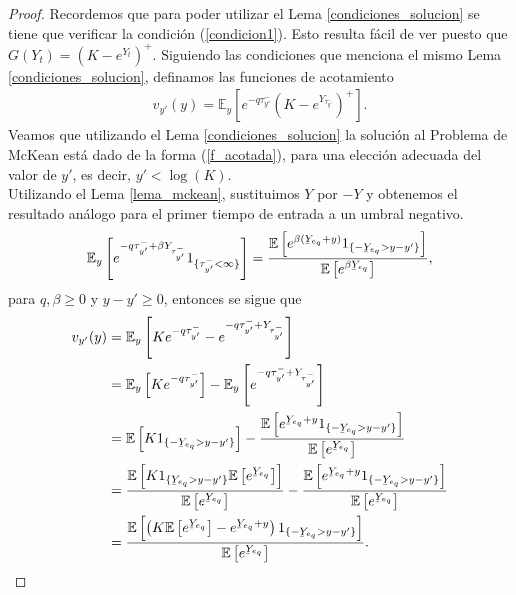 \begin{proof}
Recordemos que para poder utilizar el Lema \ref{condiciones_solucion} se tiene que verificar la condición (\ref{condicion1}). Esto resulta fácil de ver puesto que $G(Y_t) = (K - e^{Y_t})^{+}$. Siguiendo las condiciones que menciona el mismo Lema \ref{condiciones_solucion}, definamos las funciones de acotamiento
\begin{align}
v_{y'}(y) = \mathbb{E}_y \left[ e^{-q \tau_{y'}^{-}} \left( K - e^{Y_{\tau_{y'}^{-}}} \right)^{+} \right]. \label{f_acotada}
\end{align}
Veamos que utilizando el Lema \ref{condiciones_solucion} la solución al Problema de McKean está dado de la forma (\ref{f_acotada}), para una elección adecuada del valor de $y'$, es decir, $y' < \log(K)$. \\

Utilizando el Lema \ref{lema_mckean}, sustituimos $Y$ por $-Y$ y obtenemos el resultado análogo para el primer tiempo de entrada a un umbral negativo.
\begin{align}
	\mathbb{E}_y \left[ e^{-q \tau_{y'}^{-} + \beta Y_{\tau_{y'}^{-}}} 1_{\{\tau_{y'}^{-} < \infty\}} \right] = \frac{\mathbb{E} \left[ e^{\beta (\ubar{Y}_{e_q} + y)} 1_{\{ - \ubar{Y}_{e_q} > y - y'\}} \right]}{\mathbb{E} \left[ e^{\beta \ubar{Y}_{e_q}} \right]}, \label{mckean_eq1}
\end{align}
para $q, \beta \geq 0$ y $y-y' \geq 0$, entonces se sigue que
\begin{align}
v_{y'}(y) & = \mathbb{E}_y \left[ K e^{-q \tau_{y'}^{-}}  - e^{-q \tau_{y'}^{-} + Y_{\tau_{y'}^{-}}} \right] \nonumber \\
	& = \mathbb{E}_y \left[ K e^{-q \tau_{y'}^{-}} \right] - \mathbb{E}_y \left[ e^{-q \tau_{y'}^{-} + Y_{\tau_{y'}^{-}}} \right] \nonumber \\
	& = \mathbb{E} \left[ K 1_{\{ - \ubar{Y}_{e_q} > y - y'\}} \right] - \frac{\mathbb{E} \left[ e^{\ubar{Y}_{e_q} + y} 1_{\{ - \ubar{Y}_{e_q} > y - y'\}} \right]}{\mathbb{E} \left[ e^{\ubar{Y}_{e_q}} \right]} \nonumber \\
	& = \frac{ \mathbb{E} \left[K 1_{\{\ubar{Y}_{e_q} > y - y'\}} \mathbb{E} \left[ e^{\ubar{Y}_{e_q}} \right] \right] }{\mathbb{E} \left[ e^{\ubar{Y}_{e_q}} \right]} - \frac{\mathbb{E} \left[ e^{\ubar{Y}_{e_q} + y} 1_{\{ - \ubar{Y}_{e_q} > y - y'\}} \right]}{\mathbb{E} \left[ e^{\ubar{Y}_{e_q}} \right]} \nonumber \\
	& = \frac{ \mathbb{E} \left[ \left( K  \mathbb{E} \left[ e^{\ubar{Y}_{e_q}} \right] - e^{\ubar{Y}_{e_q} + y} \right) 1_{\{ - \ubar{Y}_{e_q} > y - y'\}} \right] }{ \mathbb{E} \left[ e^{\ubar{Y}_{e_q}} \right] }. \label{mckean_eq2}
\end{align}


\end{proof}
